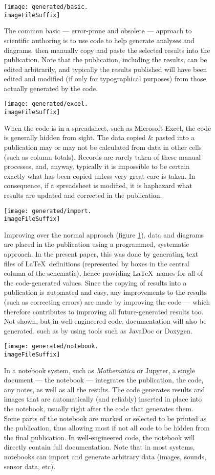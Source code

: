 \documentclass[10pt,a4paper]{article}
\begin{document}
\begin{figure} 
   \centering
   \texttt{[image: generated/basic.\\imageFileSuffix]} 
   \caption{The common basic --- error-prone and obsolete --- approach to scientific authoring is to use code to help generate analyses and diagrams, then manually copy and paste the selected results into the publication. Note that the publication, including the results, can be edited arbitrarily, and typically the results published will have been edited and modified (if only for typographical purposes) from those actually generated by the code.}
   \label{supplement-fig:basic}
\end{figure}
\begin{figure} 
   \centering
   \texttt{[image: generated/excel.\\imageFileSuffix]} 
   \caption{When the code is in a spreadsheet, such as Microsoft Excel, the code is generally hidden from sight. The data copied \& pasted into a publication may or may not be calculated from data in other cells (such as column totals). Records are rarely taken of these manual processes, and, anyway, typically it is impossible to be certain exactly what has been copied unless very great care is taken. In consequence, if a spreadsheet is modified, it is haphazard what results are updated and corrected in the publication. }
   \label{supplement-fig:excel}
\end{figure}
\begin{figure} 
   \centering
   \texttt{[image: generated/import.\\imageFileSuffix]} 
   \caption{Improving over the normal approach (figure \ref{supplement-fig:basic}), data and diagrams are placed in the publication using a programmed, systematic approach. In the present paper, this was done by generating text files of \LaTeX\ definitions (represented by boxes in the central column of the schematic), hence providing \LaTeX\ names for all of the code-generated values. Since the copying of results into a publication is automated and easy, any improvements to the results (such as correcting errors) are made by improving the code --- which therefore contributes to improving all future-generated results too. Not shown, but in well-engineered code, documentation will also be generated, such as by using tools such as JavaDoc or Doxygen.}
   \label{supplement-fig:rap}
\end{figure}
\begin{figure}[t]
   \centering
   \texttt{[image: generated/notebook.\\imageFileSuffix]} 
   \caption{In a notebook system, such as \emph{Mathematica\/} or Jupyter, a single document --- the notebook --- integrates the publication, the code, any notes, as well as all the results. The code generates results and images that are automatically (and reliably) inserted in place into the notebook, usually right after the code that generates them. Some parts of the notebook are marked or selected to be printed as the publication, thus allowing most if not all code to be hidden from the final publication. In well-engineered code, the notebook will directly contain full documentation.
Note that in most systems, notebooks can import and generate arbitrary data (images, sounds, sensor data, etc).}
   \label{supplement-fig:notebook}
\end{figure}
\end{document}
